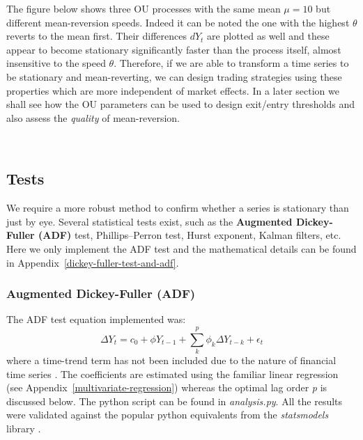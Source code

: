 \documentclass[11pt]{article}
\begin{document}
The figure below shows three OU processes with the same mean \(\mu=10\)
but different mean-reversion speeds. Indeed it can be noted the one with the highest
$\theta$ reverts to the mean first. Their differences \(dY_t\) are plotted
as well  and these appear to become stationary significantly faster than
the process itself, almost insensitive to the speed \(\theta\).
Therefore, if we are able to transform a time series to be stationary
and mean-reverting, we can design trading strategies using these
properties which are more independent of market effects. In a later
section we shall see how the OU parameters can be used to design
exit/entry thresholds and also assess the {\em quality} of mean-reversion.
    \begin{center}
    \end{center}
    { \hspace*{\fill} \\}
    
    
    \subsection{Tests}\label{tests}
    
    
    We require a more robust method to confirm  whether a
series is stationary than just by eye. Several statistical tests exist, such as the \textbf{Augmented
Dickey-Fuller (ADF)} test, Phillips--Perron test, Hurst exponent, Kalman
filters, etc.
Here we only implement the ADF test and the mathematical details can be
found in Appendix~\ref{dickey-fuller-test-and-adf}.

    \subsubsection{Augmented Dickey-Fuller (ADF) }\label{adf-test-implementation}
    
The ADF test equation implemented was: \begin{equation}
\Delta Y_t = c_0 + \phi Y_{t-1} + \sum^p_k \phi_k \Delta Y_{t-k} + \epsilon_t 
\end{equation} where a time-trend term has not been included due to the nature of
financial time series \cite{refmissing}. The coefficients are
estimated using the familiar linear regression (see Appendix~\ref{multivariate-regression}) whereas
the optimal lag order \emph{p} is discussed below. The python script can
be found in \emph{analysis.py}. All the results were validated against
the popular python equivalents from the
{\em statsmodels} library \cite{statsmodelslibrary}.
\end{document}
